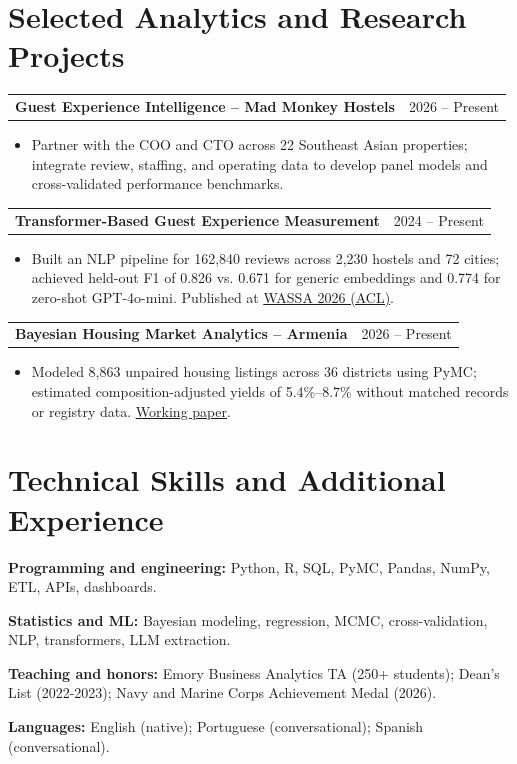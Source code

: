 \documentclass[letterpaper,11pt]{article}
\makeatletter
\newcommand{\project}[2]{%
  \noindent\begin{tabularx}{\textwidth}{@{}Xr@{}}\textbf{#1} & \small #2\\\end{tabularx}\par}
\newenvironment{details}{\begin{itemize}[leftmargin=1.25em,label=\textbullet,topsep=2pt,itemsep=0.5pt,parsep=0pt,partopsep=0pt]\small}{\end{itemize}\vspace{2pt}}
\newcommand{\cvtext}[1]{{\small #1\par}}
\makeatother
\begin{document}
\section{Selected Analytics and Research Projects}
\project{Guest Experience Intelligence -- Mad Monkey Hostels}{2026 -- Present}
\begin{details}
\item Partner with the COO and CTO across 22 Southeast Asian properties; integrate review, staffing, and operating data to develop panel models and cross-validated performance benchmarks.
\end{details}
\project{Transformer-Based Guest Experience Measurement}{2024 -- Present}
\begin{details}
\item Built an NLP pipeline for 162,840 reviews across 2,230 hostels and 72 cities; achieved held-out F1 of 0.826 vs. 0.671 for generic embeddings and 0.774 for zero-shot GPT-4o-mini. Published at \href{https://doi.org/10.18653/v1/2026.wassa-1.3}{\underline{WASSA 2026 (ACL)}}.
\end{details}
\project{Bayesian Housing Market Analytics -- Armenia}{2026 -- Present}
\begin{details}
\item Modeled 8,863 unpaired housing listings across 36 districts using PyMC; estimated composition-adjusted yields of 5.4\%--8.7\% without matched records or registry data. \href{https://imcmurry.github.io/files/McMurry_2026_Rental_Yields_Armenia.pdf}{\underline{Working paper}}.
\end{details}

\section{Technical Skills and Additional Experience}
\cvtext{\textbf{Programming and engineering:} Python, R, SQL, PyMC, Pandas, NumPy, ETL, APIs, dashboards.}
\cvtext{\textbf{Statistics and ML:} Bayesian modeling, regression, MCMC, cross-validation, NLP, transformers, LLM extraction.}
\cvtext{\textbf{Teaching and honors:} Emory Business Analytics TA (250+ students); Dean's List (2022-2023); Navy and Marine Corps Achievement Medal (2026).}
\cvtext{\textbf{Languages:} English (native); Portuguese (conversational); Spanish (conversational).}
\end{document}
